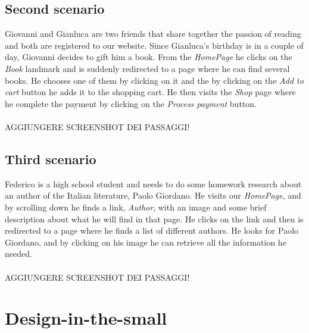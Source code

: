 \documentclass[12pt,a4paper]{article}
\begin{document}
\subsection{Second scenario}
Giovanni and Gianluca are two friends that share together the passion of reading and both are registered to our website. Since Gianluca's birthday is in a couple of day, Giovanni decides to gift him a book. From the \textit{HomePage} he clicks on the \textit{Book} landmark and is suddenly redirected to a page where he can find several books. He chooses one of them by clicking on it and the by clicking on the \textit{Add to cart} button he adds it to the shopping cart. He then visits the \textit{Shop} page where he complete the payment by clicking on the \textit{Process payment} button.\\\\
AGGIUNGERE SCREENSHOT DEI PASSAGGI!
\subsection{Third scenario}
Federico is a high school student and needs to do some homework research about an author of the Italian literature, Paolo Giordano. He visits our \textit{HomePage}, and by scrolling down he finds a link, \textit{Author}, with an image and some brief description about what he will find in that page. He clicks on the link and then is redirected to a page where he finds a list of different authors. He looks for Paolo Giordano, and by clicking on his image he can retrieve all the information he needed.\\\\
AGGIUNGERE SCREENSHOT DEI PASSAGGI!

\newpage
\section{Design-in-the-small}
\end{document}
